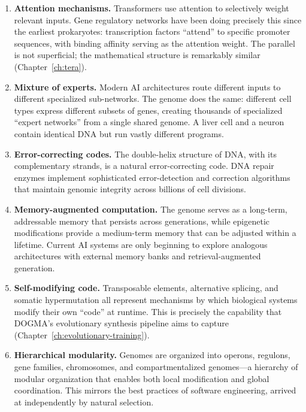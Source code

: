 \begin{enumerate}[leftmargin=1.8em]
  \item \textbf{Attention mechanisms.} Transformers use attention to selectively weight relevant inputs. Gene regulatory networks have been doing precisely this since the earliest prokaryotes: transcription factors ``attend'' to specific promoter sequences, with binding affinity serving as the attention weight. The parallel is not superficial; the mathematical structure is remarkably similar (Chapter~\ref{ch:tera}).

  \item \textbf{Mixture of experts.} Modern AI architectures route different inputs to different specialized sub-networks. The genome does the same: different cell types express different subsets of genes, creating thousands of specialized ``expert networks'' from a single shared genome. A liver cell and a neuron contain identical DNA but run vastly different programs.

  \item \textbf{Error-correcting codes.} The double-helix structure of DNA, with its complementary strands, is a natural error-correcting code. DNA repair enzymes implement sophisticated error-detection and correction algorithms that maintain genomic integrity across billions of cell divisions.

  \item \textbf{Memory-augmented computation.} The genome serves as a long-term, addressable memory that persists across generations, while epigenetic modifications provide a medium-term memory that can be adjusted within a lifetime. Current AI systems are only beginning to explore analogous architectures with external memory banks and retrieval-augmented generation.

  \item \textbf{Self-modifying code.} Transposable elements, alternative splicing, and somatic hypermutation all represent mechanisms by which biological systems modify their own ``code'' at runtime. This is precisely the capability that DOGMA's evolutionary synthesis pipeline aims to capture (Chapter~\ref{ch:evolutionary-training}).

  \item \textbf{Hierarchical modularity.} Genomes are organized into operons, regulons, gene families, chromosomes, and compartmentalized genomes---a hierarchy of modular organization that enables both local modification and global coordination. This mirrors the best practices of software engineering, arrived at independently by natural selection.
\end{enumerate}

